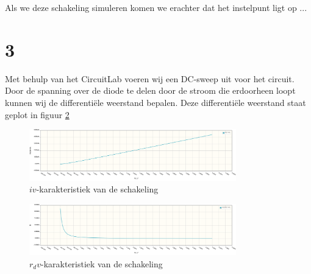 \documentclass{report}
\begin{document}
Als we deze schakeling simuleren komen we erachter dat het instelpunt ligt op ...

\section{3}
Met behulp van het CircuitLab voeren wij een DC-sweep uit voor het circuit. Door de spanning over de diode te delen door de stroom die erdoorheen loopt kunnen wij de differentiële weerstand bepalen. Deze differentiële weerstand staat geplot in figuur \ref{fig:rdv}
\begin{figure}[H]
	\centering
	\includegraphics[width=0.8\textwidth]{iv.png}
	\caption{$iv$-karakteristiek van de schakeling}
	\label{fig:iv}
\end{figure}

\begin{figure}[H]
	\centering
	\includegraphics[width=0.8\textwidth]{RdV.png}
	\caption{$r_dv$-karakteristiek van de schakeling}
	\label{fig:rdv}
\end{figure}
\end{document}
